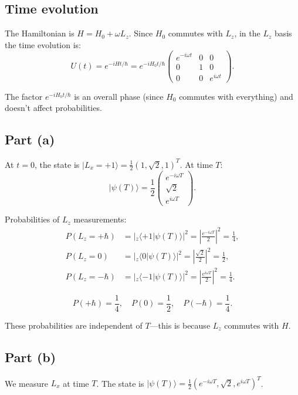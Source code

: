 \documentclass[12pt]{article}
\begin{document}
\subsection*{Time evolution}

The Hamiltonian is $H = H_0 + \omega L_z$. Since $H_0$ commutes with $L_z$, in the $L_z$ basis the time evolution is:
\[
U(t) = e^{-iHt/\hbar} = e^{-iH_0t/\hbar}\begin{pmatrix} e^{-i\omega t} & 0 & 0 \\ 0 & 1 & 0 \\ 0 & 0 & e^{i\omega t}\end{pmatrix}.
\]

The factor $e^{-iH_0t/\hbar}$ is an overall phase (since $H_0$ commutes with everything) and doesn't affect probabilities.

\subsection*{Part (a)}

At $t = 0$, the state is $|L_x = +1\rangle = \frac{1}{2}(1, \sqrt{2}, 1)^T$. At time $T$:
\[
|\psi(T)\rangle = \frac{1}{2}\begin{pmatrix} e^{-i\omega T} \\ \sqrt{2} \\ e^{i\omega T}\end{pmatrix}.
\]

Probabilities of $L_z$ measurements:
\begin{align}
P(L_z = +\hbar) &= |{}_z\langle+1|\psi(T)\rangle|^2 = \left|\frac{e^{-i\omega T}}{2}\right|^2 = \frac{1}{4}, \\
P(L_z = 0) &= |{}_z\langle 0|\psi(T)\rangle|^2 = \left|\frac{\sqrt{2}}{2}\right|^2 = \frac{1}{2}, \\
P(L_z = -\hbar) &= |{}_z\langle-1|\psi(T)\rangle|^2 = \left|\frac{e^{i\omega T}}{2}\right|^2 = \frac{1}{4}.
\end{align}

\[
\boxed{P(+\hbar) = \frac{1}{4}, \quad P(0) = \frac{1}{2}, \quad P(-\hbar) = \frac{1}{4}.}
\]

These probabilities are independent of $T$---this is because $L_z$ commutes with $H$.

\subsection*{Part (b)}

We measure $L_x$ at time $T$. The state is $|\psi(T)\rangle = \frac{1}{2}(e^{-i\omega T}, \sqrt{2}, e^{i\omega T})^T$.
\end{document}
